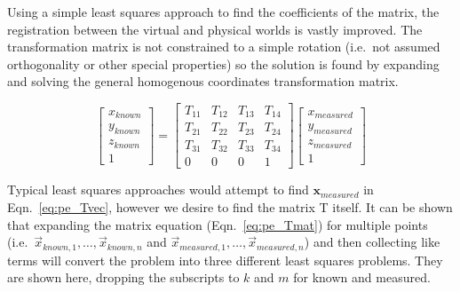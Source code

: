 Using a simple least squares approach to find the coefficients of the matrix, the registration between the virtual and physical worlds is vastly improved.
The transformation matrix is not constrained to a simple rotation (i.e.\ not assumed orthogonality or other special properties) so the solution is found by expanding and solving the general homogenous coordinates transformation matrix.

\begin{equation}
    \begin{bmatrix}
        x_{known} \\
        y_{known} \\
        z_{known} \\
        1
    \end{bmatrix} =
    \begin{bmatrix}
        T_{11} & T_{12} & T_{13} &T_{14} \\
        T_{21} & T_{22} & T_{23} &T_{24} \\
        T_{31} & T_{32} & T_{33} &T_{34} \\
        0 & 0 & 0 & 1
    \end{bmatrix}
    \begin{bmatrix}
        x_{measured} \\
        y_{measured} \\
        z_{measured} \\
        1
    \end{bmatrix}
    \label{eq:pe_Tmat}
\end{equation}

Typical least squares approaches would attempt to find $\mathbf{x}_{measured}$ in Eqn.\ \ref{eq:pe_Tvec}, however we desire to find the matrix T itself.
It can be shown that expanding the matrix equation (Eqn.\ \ref{eq:pe_Tmat}) for multiple points (i.e.\ $\vec{x}_{known,1},\dots,\vec{x}_{known,n}$ and $\vec{x}_{measured,1},\dots,\vec{x}_{measured,n}$) and then collecting like terms will convert the problem into three different least squares problems.
They are shown here, dropping the subscripts to $k$ and $m$ for known and measured.

